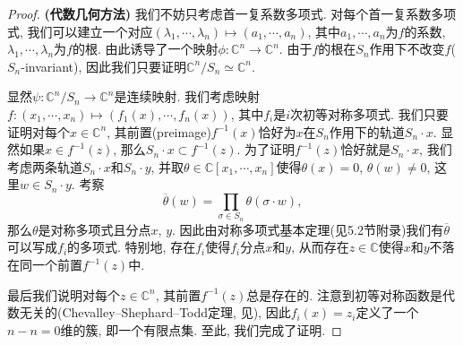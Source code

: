 \begin{proof}{\textbf{(代数几何方法)}}
我们不妨只考虑首一复系数多项式. 对每个首一复系数多项式, 我们可以建立一个对应$(\lambda_1,\cdots,\lambda_n)\mapsto (a_1,\cdots,a_n)$, 其中$a_1,\cdots,a_n$为$f$的系数, $\lambda_1,\cdots,\lambda_n$为$f$的根. 由此诱导了一个映射$\phi:\mathbb{C}^n\to\mathbb{C}^n$. 由于$f$的根在$S_n$作用下不改变$f$($S_n$-invariant), 因此我们只要证明$\mathbb{C}^n/S_n\simeq\mathbb{C}^n$.\par
显然$\psi:\mathbb{C}^n/S_n\to\mathbb{C}^n$是连续映射. 我们考虑映射$f:(x_1,\cdots,x_n)\mapsto(f_1(x),\cdots,f_n(x))$, 其中$f_i$是$i$次初等对称多项式. 我们只要证明对每个$x\in\mathbb{C}^n$, 其前置(preimage)$f^{-1}(x)$恰好为$x$在$S_n$作用下的轨道$S_n\cdot x$. 显然如果$x\in f^{-1}(z)$, 那么$S_n\cdot x\subset f^{-1}(z)$. 为了证明$f^{-1}(z)$恰好就是$S_n\cdot x$, 我们考虑两条轨道$S_n\cdot x$和$S_n\cdot y$, 并取$\theta\in\mathbb{C}[x_1,\cdots,x_n]$使得$\theta(x)=0$, $\theta(w)\ne 0$, 这里$w\in S_n\cdot y$. 考察
$$\overline{\theta}(w)=\prod_{\sigma\in S_n}\theta(\sigma\cdot w),$$
那么$\theta$是对称多项式且分点$x$, $y$. 因此由对称多项式基本定理(见\cite{hungerford2012algebra}5.2节附录)我们有$\overline{\theta}$可以写成$f_i$的多项式. 特别地, 存在$f_i$使得$f_i$分点$x$和$y$, 从而存在$z\in\mathbb{C}$使得$x$和$y$不落在同一个前置$f^{-1}(z)$中.\par
最后我们说明对每个$z\in\mathbb{C}^n$, 其前置$f^{-1}(z)$总是存在的. 注意到初等对称函数是代数无关的(Chevalley–Shephard–Todd定理, 见\cite{chevalley1955invariants}), 因此$f_i(x)=z_i$定义了一个$n-n=0$维的簇, 即一个有限点集. 至此, 我们完成了证明.
\end{proof}